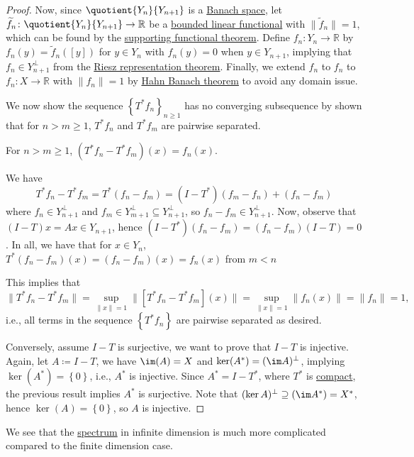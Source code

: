 \begin{proof}
	Now, since \(\quotient{Y_n}{Y_{n+1}} \) is a \hyperref[def:Banach-space]{Banach space}, let \(\widetilde{f} _n \colon \quotient{Y_n}{Y_{n+1}} \to  \mathbb{R} \) be a \hyperref[def:bounded-linear-functional]{bounded linear functional} with \(\lVert \widetilde{f} _n \rVert=1 \), which can be found by the \hyperref[thm:supporting-functional]{supporting functional theorem}. Define \(f_{n} \colon Y_n \to  \mathbb{R} \) by \(f_n (y) = \widetilde{f} _n([y])\) for \(y\in Y_n\) with \(f_n(y) = 0\) when \(y\in Y_{n+1}\), implying that \(f_n \in Y _{n+1}^{\perp}\) from the \hyperref[thm:Riesz-representation]{Riesz representation theorem}. Finally, we extend \(f_n\) to \(f_{n} \) to \(f_{n} \colon X\to \mathbb{R} \) with \(\lVert f_{n} \rVert = 1\) by \hyperref[thm:Hahn-Banach]{Hahn Banach theorem} to avoid any domain issue.

	We now show the sequence \(\left\{ T^{\ast} f_{n}  \right\} _{n\geq 1}\) has no converging subsequence by shown that for \(n > m \geq 1\), \(T^{\ast} f_n\) and \(T^{\ast} f_m\) are pairwise separated.

	\begin{claim}
		For \(n > m \geq 1\), \((T^{\ast} f_n - T^{\ast} f_m)(x) = f_n (x)\).
	\end{claim}
	\begin{explanation}
		We have
		\[
			T^{\ast} f_{n} - T^{\ast} f_m= T^{\ast} (f_{n} - f_{m}) = (I-T^{\ast} )(f_m-f_{n})+ (f_{n} -f_{m})
		\]
		where \(f_n\in Y^{\perp} _{n+1}\) and \(f_m\in Y^{\perp} _{m+1} \subseteq Y^{\perp} _{n+1}\), so \(f_n - f_m\in Y^{\perp} _{n+1}\). Now, observe that \((I-T)x = Ax\in Y_{n+1}\), hence \((I-T^{\ast} )(f_n - f_m) = (f_n - f_m)(I-T) = 0\). In all, we have that for \(x\in Y_n\), \(T^{\ast} (f_{n} - f_m)(x) = (f_n - f_m)(x)=f_n(x)\) from \(m < n\)
	\end{explanation}
	This implies that
	\[
		\lVert T^{\ast} f_n - T^{\ast} f_m \rVert
		= \sup _{\lVert x \rVert = 1} \lVert [T^{\ast} f_n - T^{\ast} f_m] (x)\rVert
		= \sup _{\lVert x \rVert = 1} \lVert f_n(x) \rVert
		= \lVert f_n \rVert
		= 1,
	\]
	i.e., all terms in the sequence \(\left\{ T^{\ast} f_n \right\} \) are pairwise separated as desired.

	Conversely, assume \(I-T\) is surjective, we want to prove that \(I-T\) is injective. Again, let \(A\coloneqq I-T\), we have \(\im(A) = X\) and \(\ker(A^{\ast} )= (\im A)^{\perp} \), implying \(\ker(A^{\ast} ) = \left\{ 0\right\} \), i.e., \(A^{\ast} \) is injective. Since \(A^{\ast} = I-T^{\ast} \), where \(T^{\ast} \) is \hyperref[def:compact-op]{compact}, the previous result implies \(A^{\ast} \) is surjective. Note that \((\ker A)^{\perp} \supseteq (\im A^{\ast} )= X^{\ast}\), hence \(\ker(A) = \left\{ 0 \right\} \), so \(A\) is injective.
\end{proof}

We see that the \hyperref[def:spectrum-point]{spectrum} in infinite dimension is much more complicated compared to the finite dimension case.